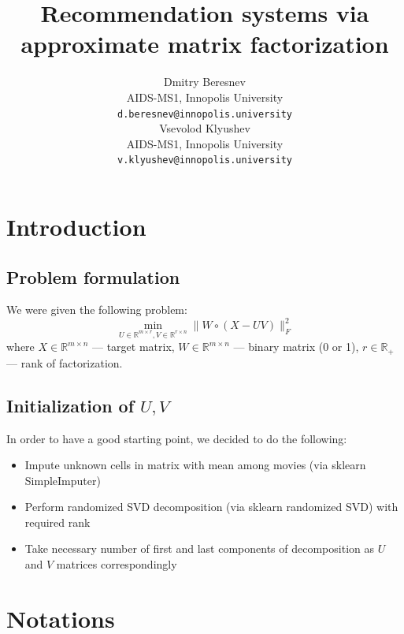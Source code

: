 \documentclass{article}
\title{Recommendation systems via approximate matrix factorization}
\date{} 					%
\author{
  \hspace{1mm}Dmitry Beresnev \\
	AIDS-MS1, Innopolis University\\
	\texttt{d.beresnev@innopolis.university} \\
	\And{}
  \hspace{1mm}Vsevolod Klyushev \\
	AIDS-MS1, Innopolis University\\
	\texttt{v.klyushev@innopolis.university}
}
\def\R{\mathbb{R}}
\begin{document}
\maketitle


\section{Introduction}

\subsection{Problem formulation}


We were given the following problem:
\begin{equation}\label{eq:problem}
  \min_{U \in \R^{m \times r}, V \in \R^{r \times n}} \|W \circ (X - UV)\|^2_F
\end{equation}
where $X \in \R^{m \times n} $ --- target matrix, $W \in \R^{m \times n} $ --- binary matrix (0 or 1), $r \in \R_+$ --- rank of factorization.

\subsection{Initialization of $U,V$}

In order to have a good starting point, we decided to do the following:
\begin{itemize}
  \item Impute unknown cells in matrix with mean among movies (via sklearn SimpleImputer)
  \item Perform randomized SVD decomposition (via sklearn randomized SVD) with required rank
  \item Take necessary number of first and last components of decomposition as $U$ and $V$ matrices correspondingly
\end{itemize}

\section{Notations}
\end{document}
